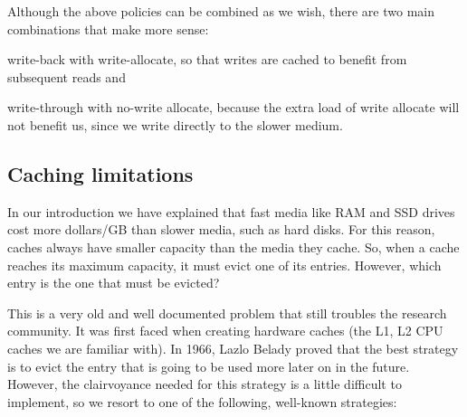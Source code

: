 Although the above policies can be combined as we wish, there are two main 
combinations that make more sense:
\begin{inparaenum}[i)]
\item write-back with write-allocate, so that writes are cached to benefit from 
	subsequent reads and
\item write-through with no-write allocate, because the extra load of write 
	allocate will not benefit us, since we write directly to the slower 
	medium.
\end{inparaenum}

\subsection{Caching limitations}

In our introduction we have explained that fast media like RAM and SSD drives 
cost more dollars/GB than slower media, such as hard disks.  For this reason, 
caches always have smaller capacity than the media they cache.  So, when a 
cache reaches its maximum capacity, it must evict one of its entries.  However, 
which entry is the one that must be evicted?

This is a very old and well documented problem that still troubles the research 
community. It was first faced when creating hardware caches (the L1, L2 CPU 
caches we are familiar with). In 1966, Lazlo Belady proved that the best 
strategy is to evict the entry that is going to be used more later on in the 
future\cite{Belady}.  However, the clairvoyance needed for this strategy is a 
little difficult to implement, so we resort to one of the following, well-known 
strategies:

